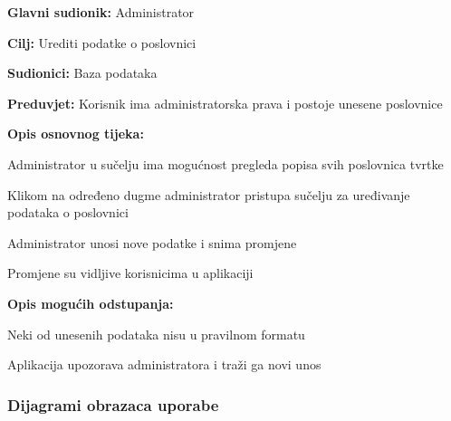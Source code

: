 					\noindent {}
					\begin{packed_item}
	
						\item \textbf{Glavni sudionik: }Administrator
						\item  \textbf{Cilj: }Urediti podatke o poslovnici
						\item  \textbf{Sudionici: }Baza podataka
						\item  \textbf{Preduvjet: }Korisnik ima administratorska prava i postoje unesene poslovnice
						\item  \textbf{Opis osnovnog tijeka:}
						
						\item[] \begin{packed_enum}
							\item Administrator u sučelju ima mogućnost pregleda popisa svih poslovnica tvrtke
							\item Klikom na određeno dugme administrator pristupa sučelju za uređivanje podataka o poslovnici
							\item Administrator unosi nove podatke i snima promjene
							\item Promjene su vidljive korisnicima u aplikaciji
						\end{packed_enum}
						
						\item  \textbf{Opis mogućih odstupanja: }
						
						\item[] \begin{packed_item}
	
							\item[3.a] Neki od unesenih podataka nisu u pravilnom formatu
							\item[] \begin{packed_enum}
								\item Aplikacija upozorava administratora i traži ga novi unos
							\end{packed_enum}
						\end{packed_item}
						
					\end{packed_item}
				
				\eject
				\subsubsection{Dijagrami obrazaca uporabe}
					
						
